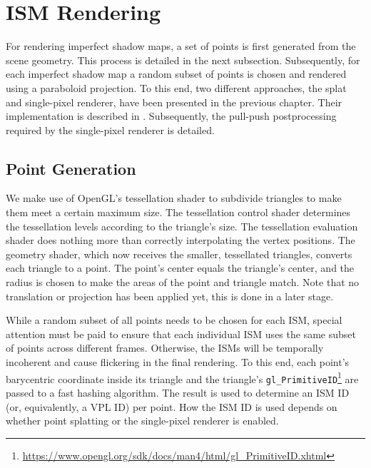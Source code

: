\section{ISM Rendering}
\label{sec:impl:ismRendering}

For rendering imperfect shadow maps, a set of points is first generated from the scene geometry. This process is detailed in the next subsection. Subsequently, for each imperfect shadow map a random subset of points is chosen and rendered using a paraboloid projection. To this end, two different approaches, the splat and single-pixel renderer, have been presented in the previous chapter. Their implementation is described in . Subsequently, the pull-push postprocessing required by the single-pixel renderer is detailed.

\subsection{Point Generation}
\label{sec:impl:pointGeneration}

We make use of OpenGL's tessellation shader to subdivide triangles to make them meet a certain maximum size. The tessellation control shader determines the tessellation levels according to the triangle's size. The tessellation evaluation shader does nothing more than correctly interpolating the vertex positions. The geometry shader, which now receives the smaller, tessellated triangles, converts each triangle to a point. The point's center equals the triangle's center, and the radius is chosen to make the areas of the point and triangle match. Note that no translation or projection has been applied yet, this is done in a later stage.

While a random subset of all points needs to be chosen for each ISM, special attention must be paid to ensure that each individual ISM uses the same subset of points across different frames. Otherwise, the ISMs will be temporally incoherent and cause flickering in the final rendering. To this end, each point's barycentric coordinate inside its triangle and the triangle's \texttt{gl\_PrimitiveID}\footnote{\url{https://www.opengl.org/sdk/docs/man4/html/gl_PrimitiveID.xhtml}} are passed to a fast hashing algorithm. The result is used to determine an ISM ID (or, equivalently, a VPL ID) per point. How the ISM ID is used depends on whether point splatting or the single-pixel renderer is enabled.



